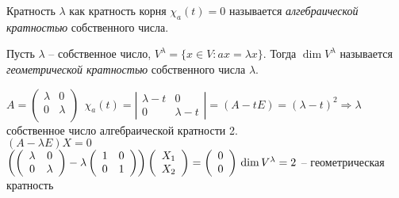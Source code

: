 \begin{Def} 
	Кратность $\lambda$ как кратность корня $\chi_a (t) = 0$ называется \textit{алгебраической кратностью}  собственного числа. 
\end{Def} 

\begin{Def}
	Пусть $\lambda$ -- собственное число, $V^{\lambda} = \{x \in V: ax = \lambda x\}$.
	Тогда $\dim V^{\lambda}$ называется \textit{геометрической кратностью}  собственного числа $\lambda$.
\end{Def}

\begin{Example}
	$A = \left(\begin{array}{cc}
		\lambda & 0\\
		0 & \lambda\\
	\end{array}
	\right) \ \ \chi_a(t) = \left|\begin{array}{cc}
		\lambda - t & 0\\
		0 & \lambda -t
	\end{array}\right| = (A-tE) = (\lambda - t)^2 \Rightarrow \lambda$ собственное число алгебраической кратности 2.\\
	$(A - \lambda E)X = 0$\\
	$\left( \left(\begin{array}{cc}
		\lambda & 0\\
		0 & \lambda
	\end{array}\right) - \lambda \left(\begin{array}{cc}
		1 & 0\\
		0 & 1
	\end{array}\right)\right) \left( \begin{array}{c}
		X_1\\
		X_2
	\end{array}\right) = \left( \begin{array}{c}
		0\\
		0
	\end{array} \right)\\
	\dim V^{\lambda} = 2$ -- геометрическая кратность
\end{Example}


